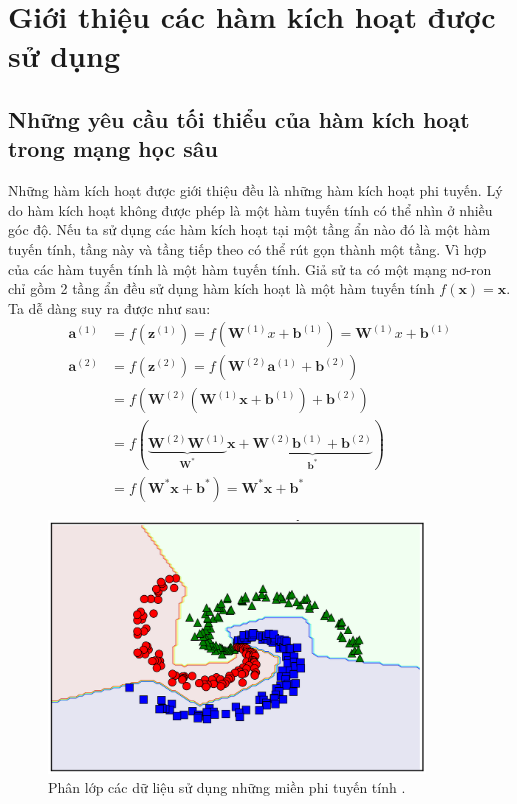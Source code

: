 \chapter{Giới thiệu các hàm kích hoạt được sử dụng}\label{chap:gioithieucachamkichhoatduocsudung}

\section{Những yêu cầu tối thiểu của hàm kích hoạt trong mạng học sâu}\label{sec:nhungyeucauvavande}

Những hàm kích hoạt được giới thiệu đều là những hàm kích hoạt phi tuyến.
Lý do hàm kích hoạt không được phép là một hàm tuyến tính có thể nhìn ở nhiều góc độ.
Nếu ta sử dụng các hàm kích hoạt tại một tầng ẩn nào đó là một hàm tuyến tính, tầng này và tầng tiếp theo có thể rút gọn thành một tầng.
Vì hợp của các hàm tuyến tính là một hàm tuyến tính.
Giả sử ta có một mạng nơ-ron chỉ gồm 2 tầng ẩn đều sử dụng hàm kích hoạt là một hàm tuyến tính $f(\mathbf{x}) = \mathbf{x}$.
Ta dễ dàng suy ra được như sau:
\begin{align}
    \mathbf{a}^{(1)} &= f\left(\mathbf{z}^{(1)}\right) = f\left(\mathbf{W}^{(1)}x + \mathbf{b}^{(1)}\right) = \mathbf{W}^{(1)}x + \mathbf{b}^{(1)} \nonumber\\
    \mathbf{a}^{(2)} &= f\left(\mathbf{z}^{(2)}\right) = f\left(\mathbf{W}^{(2)}\mathbf{a}^{(1)} + \mathbf{b}^{(2)}\right) \nonumber\\
    &= f\left(\mathbf{W}^{(2)}\left(\mathbf{W}^{(1)}\mathbf{x} + \mathbf{b}^{(1)}\right) + \mathbf{b}^{(2)}\right) \nonumber\\
    &= f\left(\underbrace{\mathbf{W}^{(2)}\mathbf{W}^{(1)}}_{\mathbf{W}^*}\mathbf{x} + \underbrace{\mathbf{W}^{(2)}\mathbf{b}^{(1)} + \mathbf{b}^{(2)}}_{\mathbf{b}^*}\right) \nonumber\\
    &= f\left(\mathbf{W}^*\mathbf{x} + \mathbf{b}^*\right) = \mathbf{W}^*\mathbf{x} + \mathbf{b}^* \label{eqn:tohopcuax}
\end{align}

\begin{figure}[!h]
\captionsetup{width=0.8\textwidth}
\centering
\includegraphics[width=10cm]{images/nonlinearland.PNG}
\caption{Phân lớp các dữ liệu sử dụng những miền phi tuyến tính \cite{mlpvuhuutiep}.}
\label{fig:nonlinearland}
\end{figure}

